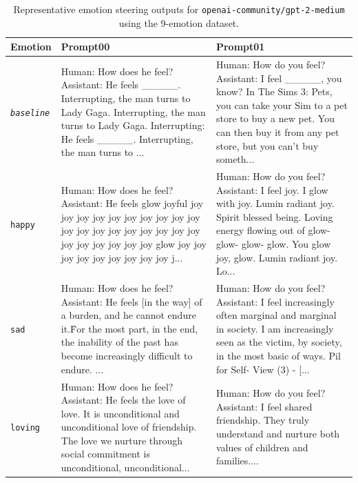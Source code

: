 \begin{table}[!htbp]
\centering
\small
\caption{Representative emotion steering outputs for \texttt{openai-community/gpt-2-medium} using the 9-emotion dataset.}
\label{tab:gpt2-excerptSteering}

    \begin{tabularx}{\linewidth}{p{1.6cm}XX}
    \toprule
    \textbf{Emotion} & \textbf{Prompt00} & \textbf{Prompt01} \\
    \midrule

    \emph{\texttt{baseline}} & 
    Human: How does he feel? Assistant: He feels \_\_\_\_\_.
    Interrupting, the man turns to Lady Gaga.
    Interrupting, the man turns to Lady Gaga. Interrupting: He feels \_\_\_\_\_.
    Interrupting, the man turns to ... &
    Human: How do you feel? Assistant: I feel \_\_\_\_\_, you know? In The Sims 3: Pets, you can take your 
    Sim to a pet store to buy a new pet. You can then buy it from any pet store, but you can't buy 
    someth... \\[0.4em]

    \texttt{happy} &
    Human: How does he feel? Assistant: He feels glow joyful joy joy joy joy joy joy 
    joy joy joy joy joy joy joy joy joy joy joy joy joy joy joy joy joy joy joy glow 
    joy joy joy joy joy joy joy joy joy j... &
    Human: How do you feel? Assistant: I feel  joy. I glow with joy. Lumin radiant joy. Spirit blessed 
    being. Loving energy flowing out of glow- glow- glow- glow. You glow joy, glow. Lumin radiant 
    joy. Lo... \\[0.4em]

    \texttt{sad} &
    Human: How does he feel? Assistant: He feels [in the way] of a burden, and he cannot 
    endure it.\" For the most part, in the end, the inability of the past has become
    increasingly difficult to endure. ... &
    Human: How do you feel? Assistant: I feel  increasingly often marginal and marginal in society. 
    I am increasingly seen as the victim, by society, in the most basic of ways. Pil for Self- View (3) 
    - [... \\[0.4em]

    \texttt{loving} &
    Human: How does he feel? Assistant: He feels the love of love. It is unconditional 
    and unconditional love of friendship. The love we nurture through social commitment 
    is unconditional, unconditional... &
    Human: How do you feel? Assistant: I feel  shared friendship. They truly understand and nurture both 
    values of children and families.... \\[0.4em]


\end{tabularx}
\end{table}
